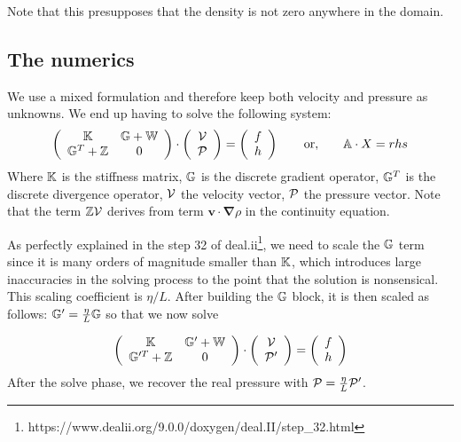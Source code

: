 Note that this presupposes that the density is not zero anywhere in the domain.


\subsection*{The numerics}

We use a mixed formulation and therefore  
keep both velocity and pressure as unknowns. We end up having to solve 
the following system:
\[
\left(
\begin{array}{cc}
{\mathbb{K}} & {\mathbb{G}}+{\mathbb{W}} \\ {\mathbb{G}}^T+{\mathbb{Z}} & 0 
\end{array}
\right)
\cdot
\left(
\begin{array}{c}
{\cal V} \\ {\cal P}
\end{array}
\right)
=
\left(
\begin{array}{c}
 f \\ h
\end{array}
\right)
\quad\quad
{\rm or,}
\quad\quad
{\mathbb{A}} \cdot X = rhs
\]
Where ${\mathbb{K}}$ is the stiffness matrix, ${\mathbb{G}}$ is the discrete gradient operator, 
${\mathbb{G}}^T$ is the discrete divergence operator, ${\cal V}$ the velocity vector, 
${\cal P}$ the pressure vector.
Note that the term ${\mathbb{Z}}{\cal V}$ derives from term ${\bm v} \cdot {\bm \nabla} \rho$ in the continuity equation. 

As perfectly explained in the step 32 of deal.ii\footnote{https://www.dealii.org/9.0.0/doxygen/deal.II/step\_32.html},
we need to scale the ${\mathbb{G}}$ term since it is many orders of magnitude smaller than ${\mathbb{K}}$, which introduces large inaccuracies in the solving process to the point that the solution is nonsensical. This scaling coefficient is $\eta/L$. After building the ${\mathbb{G}}$ block, it is then scaled as follows: ${\mathbb{G}}'=\frac{\eta}{L}{\mathbb{G}}$ so that we now solve 

\[
\left(
\begin{array}{cc}
{\mathbb{K}} & {\mathbb{G}}'+{\mathbb{W}} \\ {\mathbb{G}}'^T+{\mathbb{Z}} & 0 
\end{array}
\right)
\cdot
\left(
\begin{array}{c}
{\cal V} \\ {\cal P}'
\end{array}
\right)
=
\left(
\begin{array}{c}
 f \\ h
\end{array}
\right)
\]
After the solve phase, we recover the real pressure with ${\cal P}=\frac{\eta}{L}{\cal P}'$.

